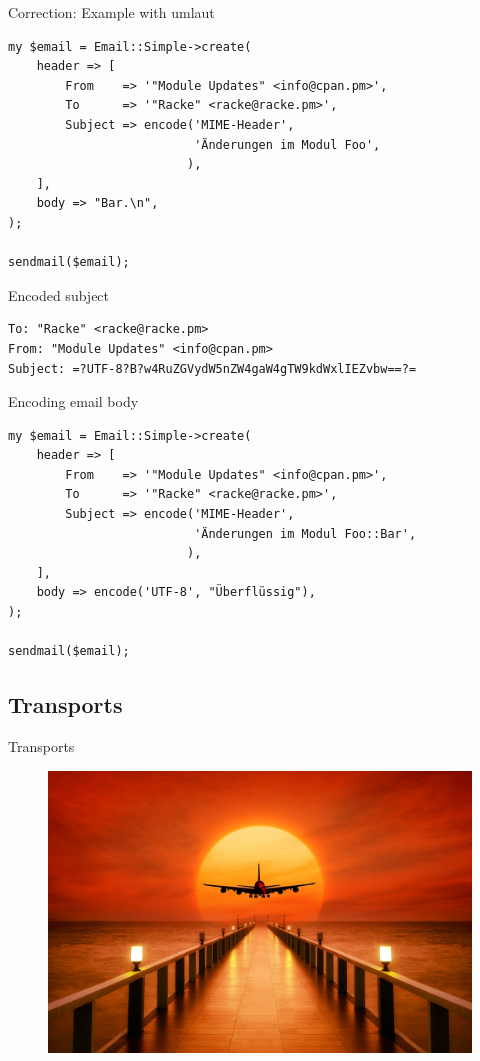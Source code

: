 \begin{frame}[fragile]{Correction: Example with umlaut}
  \begin{verbatim}
my $email = Email::Simple->create(
    header => [
        From    => '"Module Updates" <info@cpan.pm>',
        To      => '"Racke" <racke@racke.pm>',
        Subject => encode('MIME-Header', 
                          'Änderungen im Modul Foo',
                         ),
    ],
    body => "Bar.\n",
);

sendmail($email);
  \end{verbatim}
\end{frame}

\begin{frame}[fragile]{Encoded subject}
  \begin{lstlisting}
To: "Racke" <racke@racke.pm>
From: "Module Updates" <info@cpan.pm>
Subject: =?UTF-8?B?w4RuZGVydW5nZW4gaW4gTW9kdWxlIEZvbw==?=
\end{lstlisting}
\end{frame}

\begin{frame}[fragile]{Encoding email body}
  \begin{verbatim}
my $email = Email::Simple->create(
    header => [
        From    => '"Module Updates" <info@cpan.pm>',
        To      => '"Racke" <racke@racke.pm>',
        Subject => encode('MIME-Header',
                          'Änderungen im Modul Foo::Bar',
                         ),
    ],
    body => encode('UTF-8', "Überflüssig"),
);

sendmail($email);
  \end{verbatim}
\end{frame}

\subsection{Transports}

\begin{frame}{Transports}
  \begin{figure}[!ht]
    \centering
    \includegraphics[width=0.9\linewidth]{img/sunset-3193002_1920.jpg}
  \end{figure}
\end{frame}

